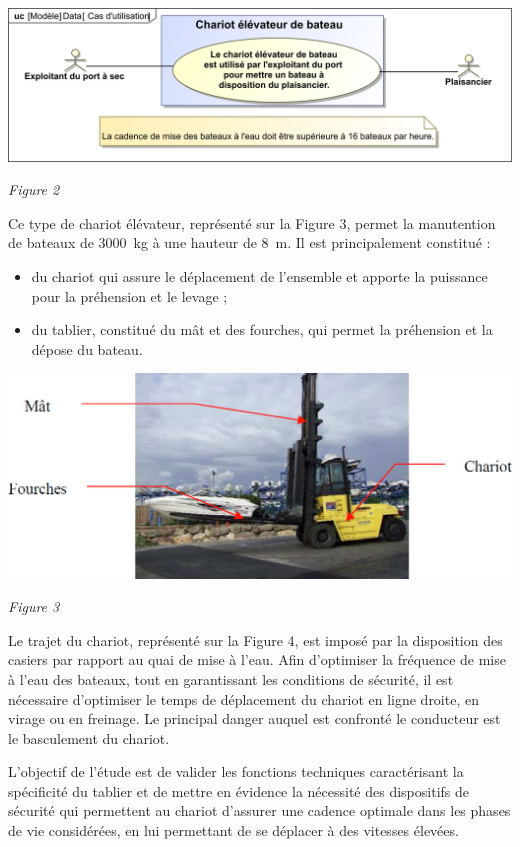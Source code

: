 \documentclass[10pt,fleqn]{article} %
\begin{document}
\begin{center}
\includegraphics[width=.8\linewidth]{images/fig_02}

\textit{Figure 2}
\end{center}

Ce type de chariot élévateur, représenté sur la Figure 3, permet la manutention de bateaux de \SI{3000}{kg} à une hauteur de \SI{8}{m}. Il est principalement constitué :
\begin{itemize}
\item du chariot qui assure le déplacement de l’ensemble et apporte la puissance pour la préhension et le levage ;
\item du tablier, constitué du mât et des fourches, qui permet la préhension et la dépose du bateau.
\end{itemize}



\begin{center}
\includegraphics[width=.8\linewidth]{images/fig_03}

\textit{Figure 3}
\end{center}


Le trajet du chariot, représenté sur la Figure 4, est imposé par la disposition des casiers par rapport au quai de mise à l’eau. Afin d’optimiser la fréquence de mise à l’eau des bateaux, tout en garantissant les conditions de sécurité, il est nécessaire d’optimiser le temps de déplacement du chariot en ligne droite, en virage ou en freinage. Le principal danger auquel est confronté le conducteur est le basculement du chariot.
\begin{obj}
L’objectif de l’étude est de valider les fonctions techniques caractérisant la spécificité du tablier et de mettre en évidence la nécessité des dispositifs de sécurité qui permettent au chariot d’assurer une cadence optimale dans les phases de vie considérées, en lui permettant de se déplacer à des vitesses élevées.
\end{obj}
\end{document}
